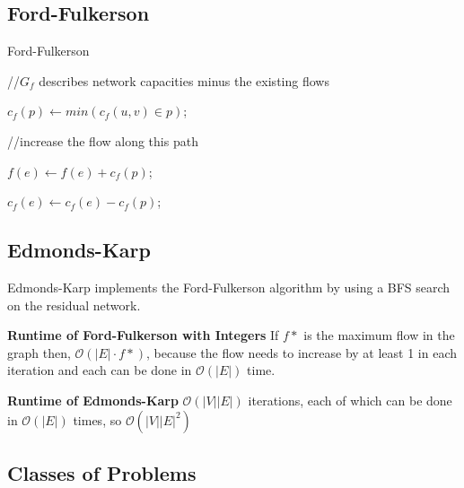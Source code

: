 \documentclass[9pt,landscape,a4paper, table]{extarticle}
\begin{document}
\begin{multicols*}{3}
\subsection{Ford-Fulkerson}

{\scriptsize
\begin{algorithm}[H]
    \caption{Ford-Fulkerson}
    
    \SetAlgoLined
    
    //$G_f$ describes network capacities minus the existing flows
    
    {
        $c_f(p) \leftarrow min( c_f(u,v)  \in p )$;
        
        //increase the flow along this path
        
         {
            $f(e) \leftarrow f(e) + c_f(p)$;
            
            $c_f(e) \leftarrow c_f(e) - c_f(p)$;
            
        }
    }
\end{algorithm}}

\subsection{Edmonds-Karp}
Edmonds-Karp implements the Ford-Fulkerson algorithm by using a BFS search on the residual network.

\textbf{Runtime of Ford-Fulkerson with Integers}
If $f*$ is the maximum flow in the graph then,
$\mathcal{O}(|E| \cdot f*)$, because the flow needs to increase by at least 1 in each iteration and each can be done in $\mathcal{O}(|E|)$ time. 

\textbf{Runtime of Edmonds-Karp}
$\mathcal{O}(|V||E|)$ iterations, each of which can be done in $\mathcal{O}( |E|)$ times, so $\mathcal{O}(|V||E|^2)$

\subsection{Classes of Problems}


\end{multicols*}
\end{document}
